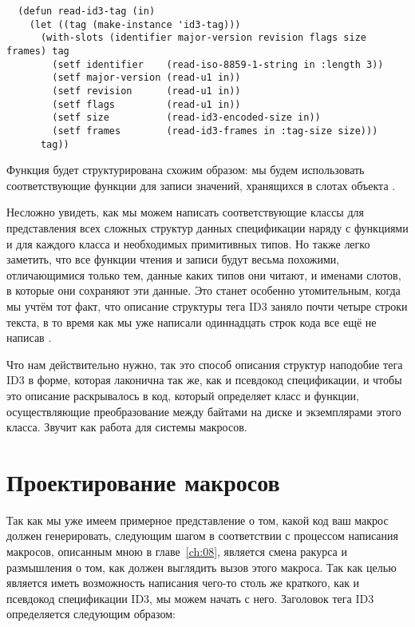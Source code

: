 \begin{lstlisting}
  (defun read-id3-tag (in)
    (let ((tag (make-instance 'id3-tag)))
      (with-slots (identifier major-version revision flags size frames) tag
        (setf identifier    (read-iso-8859-1-string in :length 3))
        (setf major-version (read-u1 in))
        (setf revision      (read-u1 in))
        (setf flags         (read-u1 in))
        (setf size          (read-id3-encoded-size in))
        (setf frames        (read-id3-frames in :tag-size size)))
      tag))
\end{lstlisting}

Функция  будет структурирована схожим образом: мы будем использовать
соответствующие функции  для записи значений, хранящихся в слотах объекта
.

Несложно увидеть, как мы можем написать соответствующие классы для представления всех
сложных структур данных спецификации наряду с функциями  и 
для каждого класса и необходимых примитивных типов. Но также легко заметить, что все
функции чтения и записи будут весьма похожими, отличающимися только тем, данные каких
типов они читают, и именами слотов, в которые они сохраняют эти данные. Это станет
особенно утомительным, когда мы учтём тот факт, что описание структуры тега ID3 заняло
почти четыре строки текста, в то время как мы уже написали одиннадцать строк кода все ещё
не написав .

Что нам действительно нужно, так это способ описания структур наподобие тега ID3 в форме,
которая лаконична так же, как и псевдокод спецификации, и чтобы это описание раскрывалось
в код, который определяет класс  и функции, осуществляющие преобразование
между байтами на диске и экземплярами этого класса. Звучит как работа для системы
макросов.

\section{Проектирование макросов}

Так как мы уже имеем примерное представление о том, какой код ваш макрос должен
генерировать, следующим шагом в соответствии с процессом написания макросов, описанным
мною в главе~\ref{ch:08}, является смена ракурса и размышления о том, как должен выглядить
вызов этого макроса. Так как целью является иметь возможность написания чего-то столь же
краткого, как и псевдокод спецификации ID3, мы можем начать с него. Заголовок тега ID3
определяется следующим образом:

